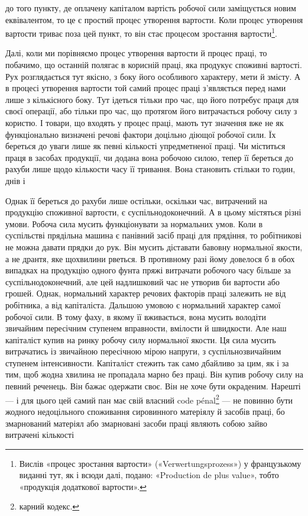 \parcont{}  %
до того пункту, де оплачену капіталом вартість робочої сили заміщується
новим еквівалентом, то це є простий процес утворення
вартости. Коли процес утворення вартости триває поза цей пункт,
то він стає процесом зростання вартости\footnote*{
Вислів «процес зростання вартости» («Verwertungsprozess») у французькому
виданні тут, як і всюди далі, подано: «Production de plus
value», тобто «продукція додаткової вартости». 
}.

Далі, коли ми порівняємо процес утворення вартости й процес
праці, то побачимо, що останній полягає в корисній праці, яка
продукує споживні вартості. Рух розглядається тут якісно,
з боку його особливого характеру, мети й змісту. А в процесі
утворення вартости той самий процес праці з’являється перед
нами лише з кількісного боку. Тут ідеться тільки про час, що
його потребує праця для своєї операції, або тільки про час, що
протягом його витрачається робочу силу з користю. І товари,
що входять у процес праці, мають тут значення вже не як функціонально
визначені речові фактори доцільно діющої робочої
сили. Їх береться до уваги лише як певні кількості упредметненої
праці. Чи міститься праця в засобах продукції, чи додана
вона робочою силою, тепер її береться до рахуби лише щодо
кількости часу її тривання. Вона становить стільки то годин,
днів і~

Однак її береться до рахуби лише остільки, оскільки час,
витрачений на продукцію споживної вартости, є суспільнодоконечний.
А в цьому містяться різні умови. Робоча сила мусить
функціонувати за нормальних умов. Коли в суспільстві прядільна
машина є панівний засіб праці для прядіння, то робітникові
не можна давати прядки до рук. Він мусить діставати бавовну
нормальної якости, а не дрантя, яке щохвилини рветься. В противному
разі йому довелося б в обох випадках на продукцію одного
фунта пряжі витрачати робочого часу більше за суспільнодоконечний,
але цей надлишковий час не утворив би вартости
або грошей. Однак, нормальний характер речових факторів праці
залежить не від робітника, а від капіталіста. Дальшою умовою
є нормальний характер самої робочої сили. В тому фаху, в якому
її вживається, вона мусить володіти звичайним пересічним ступенем
вправности, вмілости й швидкости. Але наш капіталіст
купив на ринку робочу силу нормальної якости. Ця сила мусить
витрачатись із звичайною пересічною мірою напруги, з суспільнозвичайним
ступенем інтенсивности. Капіталіст стежить так само
дбайливо за цим, як і за тим, щоб жодна хвилина не пропадала
марно без праці. Він купив робочу силу на певний реченець.
Він бажає одержати своє. Він не хоче бути окраденим. Нарешті —
і для цього цей самий пан має свій власний code pénal\footnote*{
карний кодекс. 
} — не
повинно бути жодного недоцільного споживання сировинного
матеріялу й засобів праці, бо змарнований матеріял або змарновані
засоби праці являють собою зайво витрачені кількості
\parbreak{}  %

